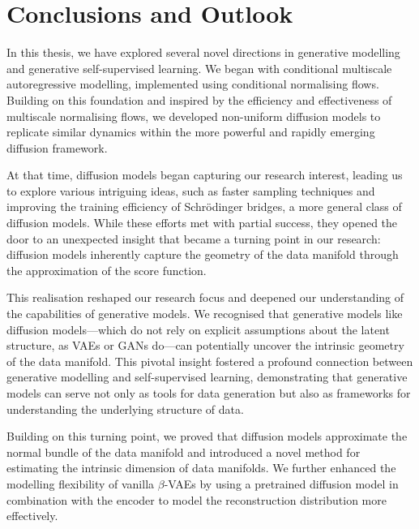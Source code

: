 
\chapter{Conclusions and Outlook}

In this thesis, we have explored several novel directions in generative modelling and generative self-supervised learning. We began with conditional multiscale autoregressive modelling, implemented using conditional normalising flows. Building on this foundation and inspired by the efficiency and effectiveness of multiscale normalising flows, we developed non-uniform diffusion models to replicate similar dynamics within the more powerful and rapidly emerging diffusion framework.

At that time, diffusion models began capturing our research interest, leading us to explore various intriguing ideas, such as faster sampling techniques and improving the training efficiency of Schrödinger bridges, a more general class of diffusion models. While these efforts met with partial success, they opened the door to an unexpected insight that became a turning point in our research: diffusion models inherently capture the geometry of the data manifold through the approximation of the score function. 

This realisation reshaped our research focus and deepened our understanding of the capabilities of generative models. We recognised that generative models like diffusion models—which do not rely on explicit assumptions about the latent structure, as VAEs or GANs do—can potentially uncover the intrinsic geometry of the data manifold. This pivotal insight fostered a profound connection between generative modelling and self-supervised learning, demonstrating that generative models can serve not only as tools for data generation but also as frameworks for understanding the underlying structure of data.

Building on this turning point, we proved that diffusion models approximate the normal bundle of the data manifold and introduced a novel method for estimating the intrinsic dimension of data manifolds. We further enhanced the modelling flexibility of vanilla $\beta$-VAEs by using a pretrained diffusion model in combination with the encoder to model the reconstruction distribution more effectively.

